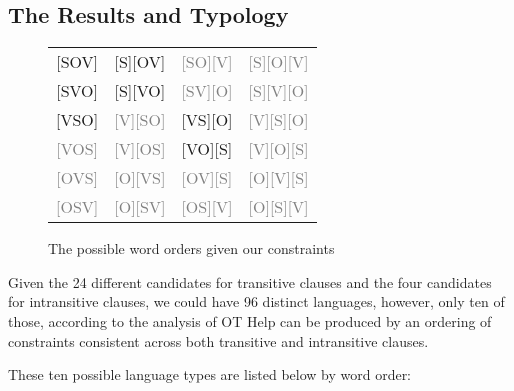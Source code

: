 \documentclass{article}
\begin{document}
\subsection{The Results and Typology}

\newcommand{\no}{\textcolor{gray}}

\begin{figure}
	\begin{center}
	\begin{tabular}{cccc}
		{}[SOV]&[S][OV]&\no{[SO][V]}&\no{[S][O][V]}\\
		{}[SVO]&[S][VO]&\no{[SV][O]}&\no{[S][V][O]}\\
		{}[VSO]&\no{[V][SO]}&[VS][O]&\no{[V][S][O]}\\
		{}\no{[VOS]}&\no{[V][OS]}&[VO][S]&\no{[V][O][S]}\\
		{}\no{[OVS]}&\no{[O][VS]}&\no{[OV][S]}&\no{[O][V][S]}\\
		{}\no{[OSV]}&\no{[O][SV]}&\no{[OS][V]}&\no{[O][S][V]}\\
	\end{tabular}
	\end{center}
	\caption{The possible word orders given our constraints}
\end{figure}

Given the 24 different candidates for transitive clauses and the four candidates for intransitive clauses, we could have 96 distinct languages, however, only ten of those, according to the analysis of OT Help can be produced by an ordering of constraints consistent across both transitive and intransitive clauses.

These ten possible language types are listed below by word order:
\end{document}
